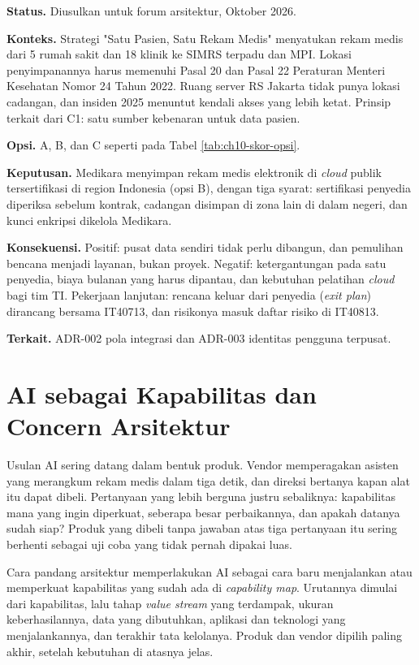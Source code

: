 \begin{kasus}[title={Kasus Medikara Health: ADR-001 Lokasi Penyimpanan Rekam Medis Elektronik}]
\textbf{Status.} Diusulkan untuk forum arsitektur, Oktober 2026.

\textbf{Konteks.} Strategi "Satu Pasien, Satu Rekam Medis" menyatukan rekam
medis dari 5 rumah sakit dan 18 klinik ke SIMRS terpadu dan MPI. Lokasi
penyimpanannya harus memenuhi Pasal 20 dan Pasal 22 Peraturan Menteri
Kesehatan Nomor 24 Tahun 2022. Ruang server RS Jakarta tidak punya lokasi
cadangan, dan insiden 2025 menuntut kendali akses yang lebih ketat. Prinsip
terkait dari C1: satu sumber kebenaran untuk data pasien.

\textbf{Opsi.} A, B, dan C seperti pada Tabel \ref{tab:ch10-skor-opsi}.

\textbf{Keputusan.} Medikara menyimpan rekam medis elektronik di \textit{cloud}
publik tersertifikasi di region Indonesia (opsi B), dengan tiga syarat:
sertifikasi penyedia diperiksa sebelum kontrak, cadangan disimpan di zona lain
di dalam negeri, dan kunci enkripsi dikelola Medikara.

\textbf{Konsekuensi.} Positif: pusat data sendiri tidak perlu dibangun, dan
pemulihan bencana menjadi layanan, bukan proyek. Negatif: ketergantungan pada
satu penyedia, biaya bulanan yang harus dipantau, dan kebutuhan pelatihan
\textit{cloud} bagi tim TI. Pekerjaan lanjutan: rencana keluar dari penyedia
(\textit{exit plan}) dirancang bersama IT40713, dan risikonya masuk daftar
risiko di IT40813.

\textbf{Terkait.} ADR-002 pola integrasi dan ADR-003 identitas pengguna
terpusat.
\end{kasus}

\section{AI sebagai Kapabilitas dan Concern Arsitektur}

Usulan AI sering datang dalam bentuk produk. Vendor memperagakan asisten yang
merangkum rekam medis dalam tiga detik, dan direksi bertanya kapan alat itu
dapat dibeli. Pertanyaan yang lebih berguna justru sebaliknya: kapabilitas
mana yang ingin diperkuat, seberapa besar perbaikannya, dan apakah datanya
sudah siap? Produk yang dibeli tanpa jawaban atas tiga pertanyaan itu sering
berhenti sebagai uji coba yang tidak pernah dipakai luas.

Cara pandang arsitektur memperlakukan AI sebagai cara baru menjalankan atau
memperkuat kapabilitas yang sudah ada di \textit{capability map}. Urutannya
dimulai dari kapabilitas, lalu tahap \textit{value stream} yang terdampak,
ukuran keberhasilannya, data yang dibutuhkan, aplikasi dan teknologi yang
menjalankannya, dan terakhir tata kelolanya. Produk dan vendor dipilih paling
akhir, setelah kebutuhan di atasnya jelas.

